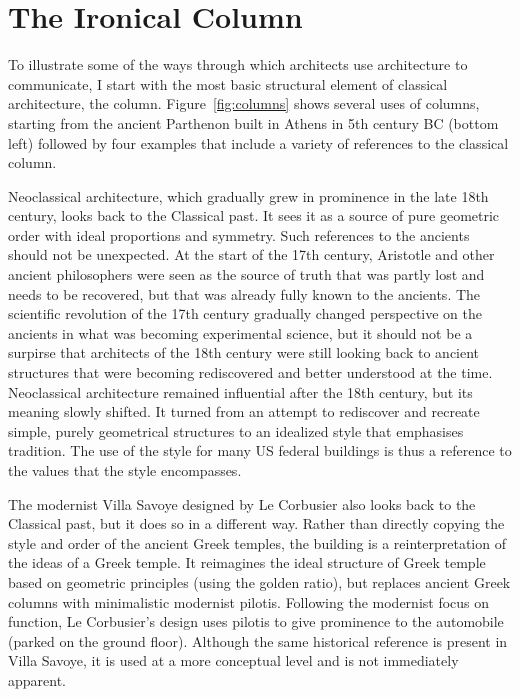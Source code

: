 \section{The Ironical Column}
To illustrate some of the ways through which architects use architecture to communicate, I start
with the most basic structural element of classical architecture, the column. Figure~\ref{fig:columns}
shows several uses of columns, starting from the ancient Parthenon built in Athens in 5th century
BC (bottom left) followed by four examples that include a variety of references to the classical
column.

\newpage

Neoclassical architecture, which gradually grew in prominence in the late 18th century, looks
back to the Classical past. It sees it as a source of pure geometric order with ideal proportions
and symmetry. Such references to the ancients should not be unexpected. At the start of the 17th
century, Aristotle and other ancient philosophers were seen as the source of truth that was partly
lost and needs to be recovered, but that was already fully known to the ancients.
The scientific revolution of the 17th century gradually changed perspective on the ancients in what
was becoming experimental science, but it should not be a surpirse that architects of the 18th century
were still looking back to ancient structures that were becoming rediscovered and better understood
at the time. Neoclassical architecture remained influential after the 18th century, but its meaning
slowly shifted. It turned from an attempt to rediscover and recreate simple, purely geometrical
structures to an idealized style that emphasises tradition. The use of the style for many US federal
buildings is thus a reference to the values that the style encompasses.

The modernist Villa Savoye designed by Le Corbusier also looks back to the Classical past,
but it does so in a different way. Rather than directly copying the style and order of the
ancient Greek temples, the building is a reinterpretation of the ideas of a Greek
temple.
It reimagines the ideal structure of Greek temple based on geometric principles (using the golden
ratio), but replaces ancient Greek columns with minimalistic modernist pilotis. Following the
modernist focus on function, Le Corbusier's design uses pilotis to give prominence to the
automobile (parked on the ground floor). Although the same historical reference is present in Villa
Savoye, it is used at a more conceptual level and is not immediately apparent.

